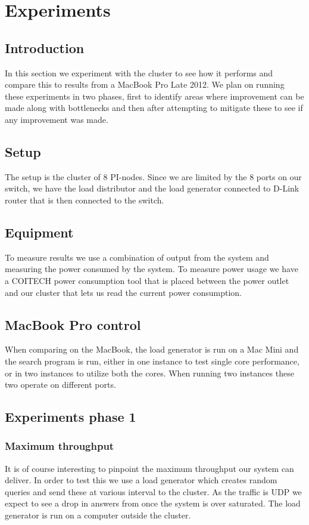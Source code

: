 
\clearpage
\section{Experiments}
\label{sec:experiments}

\subsection{Introduction}
In this section we experiment with the cluster to see how it performs and compare this to results from a MacBook Pro Late 2012. We plan on running these experiments in two phases, first to identify areas where improvement can be made along with bottlenecks and then after attempting to mitigate these to see if any improvement was made.

\subsection{Setup}
The setup is the cluster of 8 PI-nodes. Since we are limited by the 8 ports on our switch, we have the load distributor and the load generator connected to D-Link router that is then connected to the switch. 

\subsection{Equipment}
To measure results we use a combination of output from the system and measuring the power consumed by the system. To measure power usage we have a COITECH power consumption tool that is placed between the power outlet and our cluster that lets us read the current power consumption.

\subsection{MacBook Pro control}
When comparing on the MacBook, the load generator is run on a Mac Mini and the search program is run, either in one instance to test single core performance, or in two instances to utilize both the cores. When running two instances these two operate on different ports.  

\subsection{Experiments phase 1}

\subsubsection{Maximum throughput} 
It is of course interesting to pinpoint the maximum throughput our system can deliver. In order to test this we use a load generator which creates random queries and send these at various interval to the cluster. As the traffic is UDP we expect to see a drop in answers from once the system is over saturated. The load generator is run on a computer outside the cluster. 



